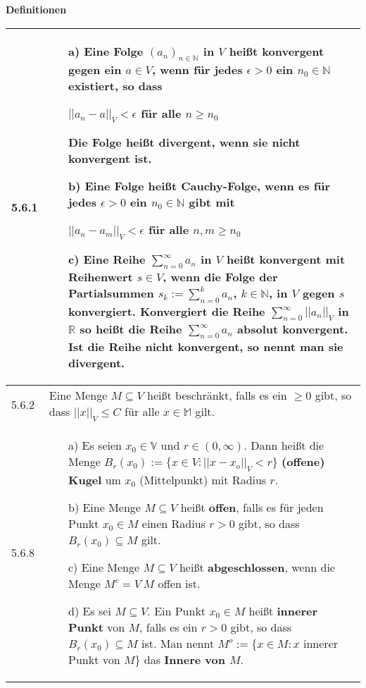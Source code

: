 \noindent
\textbf{Definitionen}
\begin{table}[H]  
\begin{tabularx}{\textwidth}{X m{16cm}}
    \toprule

    5.6.1 & \begin{itemize}[topsep=-0.5cm]
                \item[a)] Eine Folge $(a_n)_{n \in \mathbb{N}}$ in $V$ heißt \textbf{konvergent} gegen ein $a \in V$, wenn
                            für jedes $\epsilon > 0$ ein $n_0 \in \mathbb{N}$ existiert, so dass \hfill \break
                            \centerline{$||a_n - a||_V < \epsilon$ für alle $n \geq n_0$}
                            Die Folge heißt \textbf{divergent,} wenn sie nicht konvergent ist.
                \item[b)] Eine Folge heißt \textbf{Cauchy-Folge}, wenn es für jedes $\epsilon > 0$ ein $n_0 \in \mathbb{N}$ gibt
                            mit \hfill \break
                            \centerline{$||a_n - a_m||_V < \epsilon$ für alle $n,m \geq n_0$}
                \item[c)] Eine Reihe $\sum^{\infty}_{n=0} a_n$ in $V$ heißt \textbf{konvergent} mit Reihenwert $s \in V$, wenn die
                            Folge der Partialsummen $s_k := \sum^{k}_{n=0} a_n$, $k \in \mathbb{N}$, in $V$ gegen $s$ konvergiert. \hfill \break
                            Konvergiert die Reihe $\sum^{\infty}_{n=0} ||a_n||_V$ in $\mathbb{R}$ so heißt die Reihe
                            $\sum^{\infty}_{n=0}a_n$ \textbf{absolut konvergent}. \hfill \break
                            Ist die Reihe nicht konvergent, so nennt man sie \textbf{divergent}.
            \end{itemize} \vspace{-0cm} \\
    \midrule
    5.6.2 & Eine Menge $M \subseteq V$ hei\ss t beschränkt, falls es ein $ \geq 0$ gibt, so dass $||x||_V \leq C$ für alle 
            $x \in \mathbb{M}$ gilt. \\
    \midrule
    5.6.8 & \begin{itemize}[topsep=-0.5cm]
                \item[a)] Es seien $x_0 \in \mathbb{V}$ und $r \in (0, \infty)$. Dann heißt die Menge \hfill \break
                            $B_r(x_0) := \{x \in V: ||x-x_o||_V < r\} $ \textbf{(offene) Kugel} um $x_0$ (Mittelpunkt) mit Radius $r$.
                \item[b)] Eine Menge $M \subseteq V$ heißt \textbf{offen}, falls es für jeden Punkt $x_0 \in M$ einen Radius
                            $r > 0$ gibt, so dass $B_r(x_0) \subseteq M$ gilt.
                \item[c)] Eine Menge $M \subseteq V$ heißt \textbf{abgeschlossen}, wenn die Menge $M^c = V \ M$ offen ist.
                \item[d)] Es sei $M \subseteq V$. Ein Punkt $x_0 \in M$ heißt \textbf{innerer Punkt} von $M$, falls es ein
                            $r > 0$ gibt, so dass $B_r(x_0) \subseteq M$ ist. \hfill \break 
                            Man nennt $M^o := \{x \in M: x$ innerer Punkt von $M$\} das \textbf{Innere von $M$}.    
                              

\end{itemize}
\end{tabularx}
\end{table}
